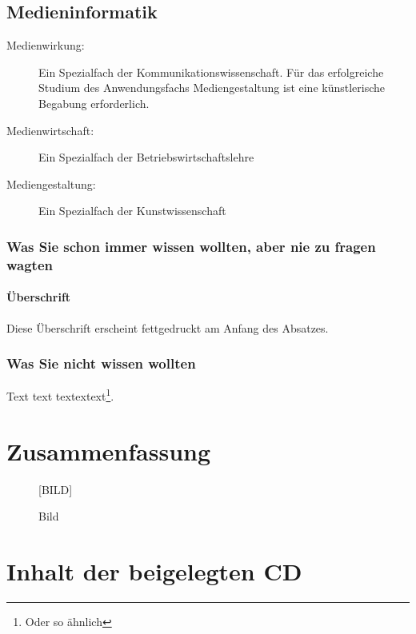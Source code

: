 \documentclass[11pt,a4paper,twoside]{article}
\begin{document}
\subsection{Medieninformatik}

\begin{description}
  \item[Medienwirkung:] Ein Spezialfach der Kommunikationswissenschaft. Für das erfolgreiche Studium des Anwendungsfachs Mediengestaltung ist eine künstlerische Begabung erforderlich.
  \item[Medienwirtschaft:] Ein Spezialfach der Betriebswirtschaftslehre
  \item[Mediengestaltung:] Ein Spezialfach der Kunstwissenschaft
\end{description}

\subsubsection{Was Sie schon immer wissen wollten, aber nie zu fragen
  wagten}

\paragraph{Überschrift}
Diese Überschrift erscheint fettgedruckt am Anfang des Absatzes.

\subsubsection{Was Sie nicht wissen wollten}

Text text textextext\footnote{Oder so ähnlich}.


\cleardoublepage
\section{Zusammenfassung}

\begin{figure}
  \begin{center}\LARGE [BILD]\end{center}
  \caption{Bild}
  \label{fig:beispielbild3}
\end{figure}

\cleardoublepage
\fancyhead[LE,RO,LO,RE]{} %
\section*{Inhalt der beigelegten CD}
\end{document}
